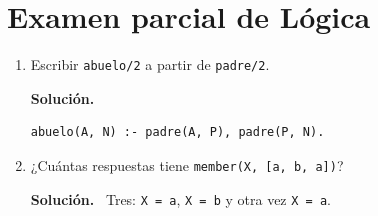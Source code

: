 \documentclass{article}
\newcommand{\solstart}{\par\noindent\textbf{Solución.}\ }
\newcommand{\solend}{\par}
\begin{document}
\section*{Examen parcial de Lógica}
\begin{enumerate}
\item Escribir \texttt{abuelo/2} a partir de \texttt{padre/2}.
\solstart
\begin{verbatim}
abuelo(A, N) :- padre(A, P), padre(P, N).
\end{verbatim}
\solend
\item ¿Cuántas respuestas tiene \texttt{member(X, [a, b, a])}?
\solstart
Tres: \texttt{X = a}, \texttt{X = b} y otra vez \texttt{X = a}.
\solend
\end{enumerate}
\end{document}
